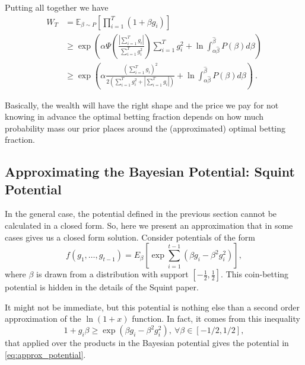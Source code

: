 \documentclass{article}
\newcommand{\field}[1]{\mathbb{#1}}
\newcommand{\E}{\field{E}}
\begin{document}
Putting all together we have
\begin{align*}
W_T &= \E_{\beta\sim P}\left[\prod_{i=1}^{T} (1+\beta g_i)\right] \\
&\geq \exp\left(\alpha \Psi\left(\frac{|\sum_{i=1}^T g_i|}{\sum_{i=1}^T g_i^2}\right) \sum_{i=1}^T g_i^2 + \ln \int_{\alpha \hat{\beta}}^{\hat{\beta}} P(\beta) d\beta\right) \\
&\geq \exp\left(\alpha \frac{(\sum_{i=1}^T g_i)^2}{2 (\sum_{i=1}^T g_i^2+|\sum_{i=1}^T g_i|)} + \ln \int_{\alpha \hat{\beta}}^{\hat{\beta}} P(\beta) d\beta\right)~.
\end{align*}

Basically, the wealth will have the right shape and the price we pay for not knowing in advance the optimal betting fraction depends on how much probability mass our prior places around the (approximated) optimal betting fraction.

\subsection{Approximating the Bayesian Potential: Squint Potential}

In the general case, the potential defined in the previous section cannot be calculated in a closed form. So, here we present an approximation that in some cases gives us a closed form solution. 
Consider potentials of the form
\begin{equation}
\label{eq:approx_potential}
f(g_1, \dots, g_{t-1})=E_{\beta} \left[\exp\sum_{i=1}^{t-1}(\beta g_i-\beta^2 g_i^2) \right],
\end{equation}
where $\beta$ is drawn from a distribution with support $[-\frac12, \frac12]$.
This coin-betting potential is hidden in the details of the Squint paper.

It might not be immediate, but this potential is nothing else than a second order approximation of the $\ln(1+x)$ function. In fact, it comes from this inequality 
\begin{equation}
\label{eq:ineq}
1+g_i \beta \geq \exp(\beta g_i - \beta^2 g_i^2), \ \forall \beta \in [-1/2,1/2],
\end{equation}
that applied over the products in the Bayesian potential gives the potential in \eqref{eq:approx_potential}.
\end{document}
